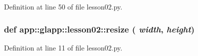 Definition at line 50 of file lesson02.py.
\subsubsection{\setlength{\rightskip}{0pt plus 5cm}def app::glapp::lesson02::resize ( {\em width},  {\em height})}\label{namespaceapp_1_1glapp_1_1lesson02_5642601bf9184612f51ed31721dc32d3}




Definition at line 11 of file lesson02.py.